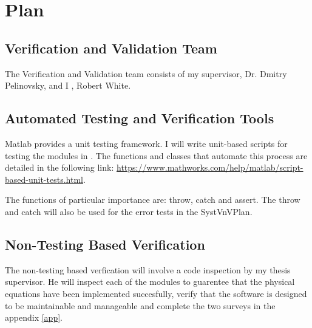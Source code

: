 \documentclass[12pt, titlepage]{article}
\begin{document}

\section{Plan}
	
\subsection{Verification and Validation Team}

The Verification and Validation team consists of my supervisor, Dr. Dmitry
Pelinovsky, and I , Robert White. 

\subsection{Automated Testing and Verification Tools}

Matlab provides a unit testing framework. I will write unit-based scripts 
for testing the modules in \progname. The functions and classes that automate 
this process 
are detailed in the following link: 
\url{https://www.mathworks.com/help/matlab/script-based-unit-tests.html}.\\ 

The functions of particular importance are: throw, catch and assert. The throw 
and catch will also be used for the error tests in the SystVnVPlan. 


\subsection{Non-Testing Based Verification} 

The non-testing based verfication will involve a code inspection by my 
thesis supervisor. He will inspect each of the modules to guarentee that the 
physical equations have been implemented succesfully, verify that the software 
is designed to be maintainable and manageable and complete the 
two surveys in the appendix \ref{app}. 
\end{document}
